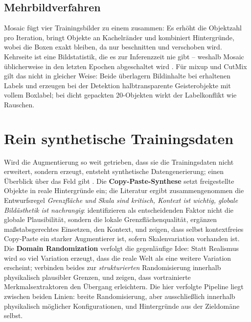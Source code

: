 \subsection{Mehrbildverfahren}

Mosaic \parencite{bochkovskiy2020} fügt vier Trainingsbilder zu einem zusammen:
Es erhöht die Objektzahl pro Iteration, bringt Objekte an Kachelränder und
kombiniert Hintergründe, wobei die Boxen exakt bleiben, da nur beschnitten und
verschoben wird. Kehrseite ist eine Bildstatistik, die es zur Inferenzzeit nie
gibt -- weshalb Mosaic üblicherweise in den letzten Epochen abgeschaltet wird
\parencite{ultralyticsdocs}. Für mixup und CutMix gilt das nicht in gleicher
Weise: Beide überlagern Bildinhalte bei erhaltenen Labels und erzeugen bei der
Detektion halbtransparente Geisterobjekte mit vollem Boxlabel; bei dicht
gepackten 20\px-Objekten wirkt der Labelkonflikt wie Rauschen.

\section{Rein synthetische Trainingsdaten}
\label{sec:augsynthese}

Wird die Augmentierung so weit getrieben, dass sie die Trainingsdaten nicht
erweitert, sondern erzeugt, entsteht synthetische Datengenerierung; einen
Überblick über das Feld gibt \textcite{nikolenko2021}. Die
\textbf{Copy-Paste-Synthese} setzt freigestellte Objekte in reale Hintergründe
ein; die Literatur ergibt zusammengenommen die Entwurfsregel
\emph{Grenzfläche und Skala sind kritisch, Kontext ist wichtig, globale
Bildästhetik ist nachrangig}: \textcite{dwibedi2017} identifizieren als
entscheidenden Faktor nicht die globale Plausibilität, sondern die lokale
Grenzflächenqualität, \textcite{georgakis2017} ergänzen maßstabsgerechtes
Einsetzen, \textcite{dvornik2018} den Kontext, und \textcite{ghiasi2021} zeigen,
dass selbst kontextfreies Copy-Paste ein starker Augmentierer ist, sofern
Skalenvariation vorhanden ist. Die \textbf{Domain Randomization}
\parencite{tobin2017,tremblay2018} verfolgt die gegenläufige Idee: Statt
Realismus wird so viel Variation erzeugt, dass die reale Welt als eine weitere
Variation erscheint; \textcite{prakash2019} verbinden beides zur
\emph{strukturierten} Randomisierung innerhalb physikalisch plausibler Grenzen,
und \textcite{hinterstoisser2018} zeigen, dass vortrainierte Merkmalsextraktoren
den Übergang erleichtern. Die hier verfolgte Pipeline liegt zwischen beiden
Linien: breite Randomisierung, aber ausschließlich innerhalb physikalisch
möglicher Konfigurationen, und Hintergründe aus der Zieldomäne selbst.

